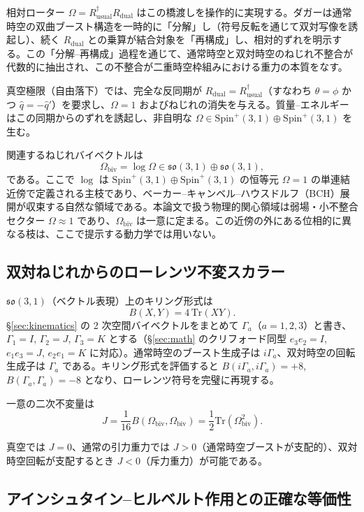 \documentclass[dvipdfmx,a4paper]{article}
\begin{document}
相対ローター $\Omega = R_\text{usual}^\dagger R_\text{dual}$ はこの橋渡しを操作的に実現する。ダガーは通常時空の双曲ブースト構造を一時的に「分解」し（符号反転を通じて双対写像を誘起し）、続く $R_\text{dual}$ との乗算が結合対象を「再構成」し、相対的ずれを明示する。この「分解--再構成」過程を通じて、通常時空と双対時空のねじれ不整合が代数的に抽出され、この不整合が二重時空枠組みにおける重力の本質をなす。

真空極限（自由落下）では、完全な反同期が $R_\text{dual} = R_\text{usual}^\dagger$（すなわち $\theta = \phi$ かつ $\hat{q} = -\hat{q}'$）を要求し、$\Omega = 1$ およびねじれの消失を与える。質量--エネルギーはこの同期からのずれを誘起し、非自明な $\Omega \in \mathrm{Spin}^+(3,1) \oplus \mathrm{Spin}^+(3,1)$ を生む。

関連するねじれバイベクトルは
\[
\Omega_\text{biv} = \log \Omega \in \mathfrak{so}(3,1) \oplus \mathfrak{so}(3,1),
\]
である。ここで $\log$ は $\mathrm{Spin}^+(3,1) \oplus \mathrm{Spin}^+(3,1)$ の恒等元 $\Omega = 1$ の単連結近傍で定義される主枝であり、ベーカー--キャンベル--ハウスドルフ（BCH）展開が収束する自然な領域である。本論文で扱う物理的関心領域は弱場・小不整合セクター $\Omega \approx 1$ であり、$\Omega_\text{biv}$ は一意に定まる。この近傍の外にある位相的に異なる枝は、ここで提示する動力学では用いない。

\subsection{双対ねじれからのローレンツ不変スカラー}

$\mathfrak{so}(3,1)$（ベクトル表現）上のキリング形式は
\[
B(X,Y) = 4\,\mathrm{Tr}(X Y).
\]
\S\ref{sec:kinematics} の 2 次空間バイベクトルをまとめて $\Gamma_a$（$a=1,2,3$）と書き、$\Gamma_1 = I$, $\Gamma_2 = J$, $\Gamma_3 = K$ とする（\S\ref{sec:math} のクリフォード同型 $e_3e_2 = I$, $e_1e_3 = J$, $e_2e_1 = K$ に対応）。通常時空のブースト生成子は $i\Gamma_a$、双対時空の回転生成子は $\Gamma_a$ である。キリング形式を評価すると $B(i\Gamma_a, i\Gamma_a) = +8$, $B(\Gamma_a, \Gamma_a) = -8$ となり、ローレンツ符号を完璧に再現する。

一意の二次不変量は
\[
J = \frac{1}{16} B(\Omega_\text{biv}, \Omega_\text{biv}) = \frac{1}{2} \mathrm{Tr}(\Omega_\text{biv}^2).
\]

真空では $J = 0$、通常の引力重力では $J > 0$（通常時空ブーストが支配的）、双対時空回転が支配するとき $J < 0$（斥力重力）が可能である。

\subsection{アインシュタイン--ヒルベルト作用との正確な等価性}
\end{document}
